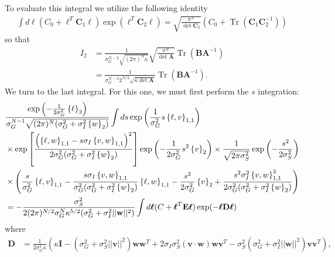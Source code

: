 \documentclass[11pt]{article}
\DeclareMathOperator{\Tr}{Tr}
\begin{document}
To evaluate this integral we utilize the following identity
\begin{align}
\int d\boldsymbol{\ell} \left(C_0 +\boldsymbol{\ell}^T \mathbf{C}_1 \boldsymbol{\ell}\right)\exp\left(\boldsymbol{\ell}^T \mathbf{C}_2 \boldsymbol{\ell}\right) = \sqrt{\frac{\pi^N}{\det \mathbf{C}_2}}\left(C_0 + \Tr\left(\mathbf{C}_1\mathbf{C}_2^{-1}\right)\right)
\end{align}
so that
\begin{align}
	I_2 &= \frac{1}{\sigma_G^{N-2}\sqrt{(2\pi)^N \kappa}} \sqrt{\frac{\pi^N}{\det \mathbf{A}}} \Tr(\mathbf{B} \mathbf{A}^{-1}) \\
	&= \frac{1}{\sigma_G^{N-2} 2^{N/2} \sqrt{\kappa \det \mathbf{A}}}\Tr(\mathbf{B} \mathbf{A}^{-1}).
\end{align}
We turn to the last integral. For this one, we must first perform the $s$ integration: 
\begin{align}
	&\frac{\exp\left(-\frac{1}{2\sigma_G^2}\left\{\ell \right\}_2\right)}{\sigma_G^{N-1}\sqrt{(2\pi)^N(\sigma_G^2 + \sigma_I^2 \left\{w\right\}_2)}} \int ds \exp\left(\frac{1}{\sigma_G^2} s\left\{\ell, v\right\}_{1,1}\right) \notag \\
	&\times \exp\left[\frac{\left(\left\{\ell, w\right\}_{1,1} - s \sigma_I \left\{v,w\right\}_{1,1}\right)^2}{2\sigma_G^2 (\sigma_G^2 + \sigma_I^2 \left\{w\right\}_2)}\right]\exp\left(-\frac{1}{2\sigma_G^2}s^2 \left\{v\right\}_2\right)\times \frac{1}{\sqrt{2\pi \sigma_S^2}} \exp\left(-\frac{s^2}{2\sigma_S^2}\right) \notag \\
	&\times \left(\frac{s}{\sigma_G^2} \left\{\ell, v\right\}_{1,1} - \frac{s \sigma_I \left\{v,w\right\}_{1,1}}{\sigma_G^2 (\sigma_G^2 + \sigma_I^2 \left\{w\right\}_2)}\left\{\ell, w\right\}_{1,1} - \frac{s^2}{2\sigma_G^2} \left\{v\right\}_2   + \frac{s^2 \sigma_I^2 \left\{v,w\right\}_{1,1}^2}{2\sigma_G^2 (\sigma_G^2 + \sigma_I^2 \left\{w\right\}_2)}\right) \\
	&= -\frac{\sigma_S^2}{2(2\pi)^{N/2} \sigma_G^N \kappa^{5/2} (\sigma_G^2 + \sigma_I^2 ||\mathbf{w}||^2)}\int d\boldsymbol{\ell}(C + \boldsymbol{\ell}^T \mathbf{E} \boldsymbol{\ell})\exp(-\boldsymbol{\ell} \mathbf{D} \boldsymbol{\ell})
\end{align}
where
\begin{align}
\mathbf{D} &= \frac{1}{2\sigma_G^2 \kappa}\left(\kappa \mathbf{I} - (\sigma_G^2 + \sigma_S^2 ||\mathbf{v}||^2) \mathbf{ww}^T + 2 \sigma_I \sigma_S^2 (\mathbf{v}\cdot \mathbf{w}) \mathbf{wv}^T - \sigma_S^2 (\sigma_G^2 + \sigma_I^2 ||\mathbf{w}||^2)\mathbf{vv}^T\right),
\end{align}
\end{document}
